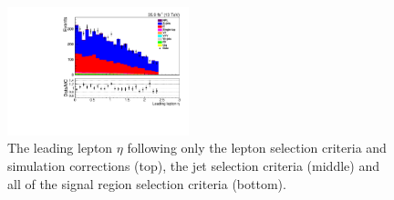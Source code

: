 \begin{figure}[h]
\includegraphics[width=0.47\textwidth]{figs/background-estimation/plots/unblinded/prompt_mumu_ttbarInc/lep1Eta_NPL_mumu_wMass_mumu.pdf}
\caption{
The leading lepton $\eta$ following only the lepton selection criteria and simulation corrections (top), the jet selection criteria (middle) and all of the signal region selection criteria (bottom).
}
\label{fig:SR_lep1Eta}
\end{figure}

